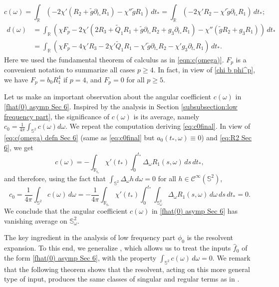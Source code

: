 \documentclass[10pt,a4paper,reqno]{amsart}
\newcommand{\CI}{\mathcal{C}^\infty}
\newcommand{\RR}{\mathbb{R}}
\newcommand{\pa}{\partial}
\renewcommand{\S}{{\mathbb S}}
\theoremstyle{definition}
\theoremstyle{remark}
\numberwithin{equation}{section}
\newcommand{\ts}{t_*}
\newcommand{\wh}{\widehat}
\begin{document}
\begin{equation}
\label{eq:c(omega) defn Sec 6}
    c(\omega) = \int_{\RR} (-2\chi'(R_2+\tilde{g}\pa_{\ts}R_1) - \chi''\tilde{g} R_1)\,d\ts = \int_{\RR} (-2\chi'R_2 -\chi'\tilde{g}\pa_{\ts}R_1)\,d\ts;
\end{equation}
\begin{equation}
\label{eq:d(omega) defn Sec 6}
\begin{split}
    d(\omega) &= \int_{\RR} ( \chi F_p -2\chi'(2R_3+\widetilde{Q}_1 R_1 + \tilde{g}\pa_{\ts}R_2 + g_3 \pa_{\ts}R_1) - \chi''(\tilde{g}R_2+ g_3 R_1))\,d\ts \\
    &= \int_{\RR} (\chi F_p -4\chi'R_3 - 2\chi'\widetilde{Q}_1 R_1 - \chi' \tilde{g}\pa_{\ts}R_2 - \chi' g_3 \pa_{\ts}R_1)\,d\ts.
\end{split}
\end{equation}
Here we used the fundamental theorem of calculus as in \eqref{eqn:c(omega)}. $F_p$ is a convenient notation to summarize all cases $p\geq 4$. In fact, in view of \eqref{chi b phi^p}, we have $F_p = b_0 R_1^4$ if $p=4$, and $F_p=0$ for all $p\geq 5$. 

Let us make an important observation about the angular coefficient $c(\omega)$ in \eqref{fhat(0) asymp Sec 6}. Inspired by the analysis in Section \ref{subsubsection:low frequency part}, the significance of $c(\omega)$ is its average, namely $c_0 = \frac{1}{4\pi}\int_{\S^2} c(\omega) d\omega$. We repeat the computation deriving \eqref{eq:c0final}. In view of \eqref{eq:c(omega) defn Sec 6} (same as \eqref{eq:c0final} but $a_0(\ts,\omega)\equiv 0$) and \eqref{eq:R2 Sec 6}, we get
\[
    c(\omega) = -\int_{\RR_{\ts}}\chi'(\ts)\int_0^{\ts} \Delta_\omega R_1(s,\omega)\,ds\,d\ts,
\]
and therefore, using the fact that $\int_{\S^2}\Delta_\omega h\,d\omega = 0$ for all $h\in\CI(\S^2)$,
\begin{equation}
\label{c(omega) vanishing avg Sec 6}
    c_0 = \frac{1}{4\pi}\int_{\S^2} c(\omega) \,d\omega = -\frac{1}{4\pi}\int_{\RR_{\ts}}\chi'(\ts)\int_0^{\ts} \int_{\S_\omega^2} \Delta_\omega R_1(s,\omega)\,d\omega\,ds\,d\ts = 0.
\end{equation}
We conclude that the angular coefficient $c(\omega)$ in \eqref{fhat(0) asymp Sec 6} has vanishing average on $\S_\omega^2$.

The key ingredient in the analysis of low frequency part $\phi_0$ is the resolvent expansion. To this end, we generalize \cite[Theorem 3.1]{Hin22}, which allows us to treat the inputs $\wh{f}_0$ of the form \eqref{fhat(0) asymp Sec 6}, with the property $\int_{\S^2} c(\omega)\,d\omega = 0$. We remark that the following theorem shows that the resolvent, acting on this more general type of input, produces the same classes of singular and regular terms as in \cite[Theorem 3.1]{Hin22}.
\end{document}
